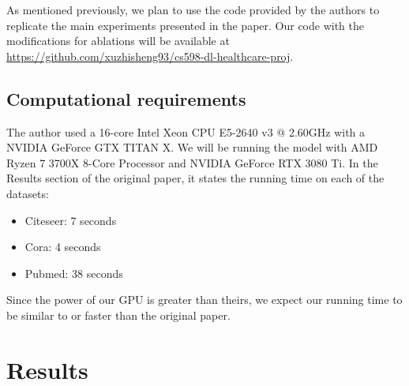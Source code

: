 \documentclass[11pt,a4paper]{article}
\begin{document}
As mentioned previously, we plan to use the code provided by the authors to replicate the main experiments presented in the paper. Our code with the modifications for ablations will be available at \url{https://github.com/xuzhisheng93/cs598-dl-healthcare-proj}.

\subsection{Computational requirements}

The author used a 16-core Intel Xeon CPU E5-2640 v3 @ 2.60GHz with a NVIDIA GeForce GTX TITAN X. We will be running the model with AMD Ryzen 7 3700X 8-Core Processor and NVIDIA GeForce RTX 3080 Ti. In the Results section of the original paper, it states the running time on each of the datasets:

\begin{itemize}
  \item Citeseer: 7 seconds
  \item Cora: 4 seconds
  \item Pubmed: 38 seconds
\end{itemize}

Since the power of our GPU is greater than theirs, we expect our running time to be similar to or faster than the original paper.

\section{Results}

\end{document}
